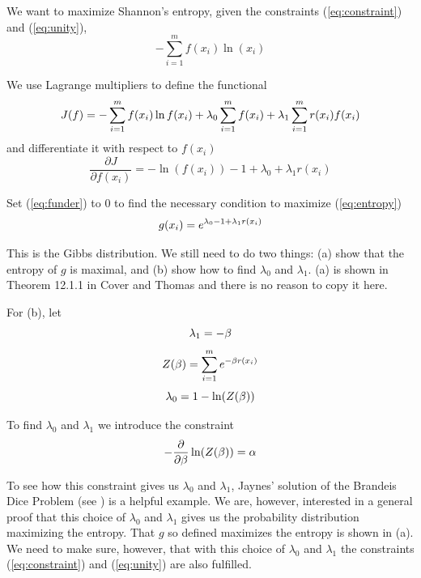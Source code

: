\documentclass[12pt]{article}
\begin{document}
We want to maximize Shannon's entropy, given the constraints
({\ref{eq:constraint}}) and ({\ref{eq:unity}}),
\begin{equation}
  \label{eq:entropy}
-\sum_{i=1}^{m}f(x_{i})\ln(x_{i})
\end{equation}

We use Lagrange multipliers to define the functional
\begin{equation}
  \label{eq:functional}
J(f)=-\sum_{i=1}^{m}f(x_{i})\ln{}f(x_{i})+\lambda_{0}\sum_{i=1}^{m}f(x_{i})+\lambda_{1}\sum_{i=1}^{m}r(x_{i})f(x_{i})\notag
\end{equation}
and differentiate it with respect to $f(x_{i})$
\begin{equation}
  \label{eq:funder}
\frac{\partial{}J}{\partial{}f(x_{i})}=-\ln(f(x_{i}))-1+\lambda_{0}+\lambda_{1}r(x_{i})
\end{equation}

Set ({\ref{eq:funder}}) to $0$ to find the necessary condition to
maximize ({\ref{eq:entropy}})
\begin{equation}
  \label{eq:coverthomas}
g(x_{i})=e^{\lambda_{0}-1+\lambda_{1}r(x_{i})}\notag
\end{equation}

This is the Gibbs distribution. We still need to do two things: (a)
show that the entropy of $g$ is maximal, and (b) show how to find
$\lambda_{0}$ and $\lambda_{1}$. (a) is shown in Theorem 12.1.1 in
Cover and Thomas  and there is no reason to
copy it here. 

For (b), let
\begin{equation}
  \label{eq:l1}
\lambda_{1}=-\beta\notag
\end{equation}
\begin{equation}
  \label{eq:zet}
Z(\beta)=\sum_{i=1}^{m}e^{-\beta{}r(x_{i})}\notag
\end{equation}
\begin{equation}
  \label{eq:l0}
\lambda_{0}=1-\ln(Z(\beta))\notag
\end{equation}

To find $\lambda_{0}$ and $\lambda_{1}$ we introduce the constraint
\begin{equation}
  \label{eq:logcon}
-\frac{\partial}{\partial{}\beta}\ln(Z(\beta))=\alpha\notag
\end{equation}

To see how this constraint gives us $\lambda_{0}$ and $\lambda_{1}$,
Jaynes' solution of the Brandeis Dice Problem (see
) is a helpful example. We are, however,
interested in a general proof that this choice of $\lambda_{0}$ and
$\lambda_{1}$ gives us the probability distribution maximizing the
entropy. That $g$ so defined maximizes the entropy is shown in (a). We
need to make sure, however, that with this choice of $\lambda_{0}$ and
$\lambda_{1}$ the constraints ({\ref{eq:constraint}}) and
({\ref{eq:unity}}) are also fulfilled.
\end{document}

